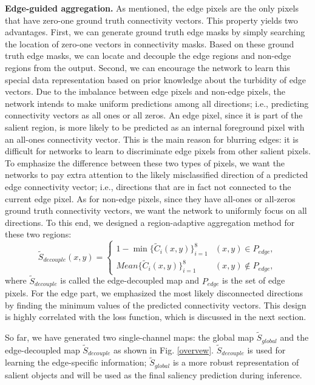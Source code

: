 \documentclass[review]{cvpr}
\begin{document}
\textbf{Edge-guided aggregation.} As mentioned, the edge pixels are the only pixels that have zero-one ground truth connectivity vectors. This property yields two advantages. First, we can generate ground truth edge masks by simply searching the location of zero-one vectors in connectivity masks. Based on these ground truth edge masks, we can locate and decouple the edge regions and non-edge regions from the output. Second, we can encourage the network to learn this special data representation based on prior knowledge about the turbidity of edge vectors. Due to the imbalance between edge pixels and non-edge pixels, the network intends to make uniform predictions among all directions; i.e., predicting connectivity vectors as all ones or all zeros. An edge pixel, since it is part of the salient region, is more likely to be predicted as an internal foreground pixel with an all-ones connectivity vector. This is the main reason for blurring edges: it is difficult for networks to learn to discriminate edge pixels from other salient pixels. To emphasize the difference between these two types of pixels, we want the networks to pay extra attention to the likely misclassified direction of a predicted edge connectivity vector; i.e., directions that are in fact not connected to the current edge pixel. As for non-edge pixels, since they have all-ones or all-zeros ground truth connectivity vectors, we want the network to uniformly focus on all directions. To this end, we designed a region-adaptive aggregation method for these two regions:
\begin{equation}
\label{decouple}
{\widetilde S_{decouple}(x,y)=
\begin{cases}
{1 - \min \{ {{\widetilde C}_i}(x,y)\} _{i = 1}^8}& {(x,y) \in {P_{edge}}},\\
{Mean\{ {{\widetilde C}_i}(x,y)\} _{i = 1}^8}& {(x,y) \notin {P_{edge}}},
\end{cases}}
\end{equation}
where $\widetilde S_{decouple}$ is called the edge-decoupled map and $P_{edge}$ is the set of edge pixels. For the edge part, we emphasized the most likely disconnected directions by finding the minimum values of the predicted connectivity vectors. This design is highly correlated with the loss function, which is discussed in the next section.

So far, we have generated two single-channel maps: the global map $\widetilde S_{global}$ and the edge-decoupled map $\widetilde S_{decouple}$ as shown in Fig. \ref{overvew}. $\widetilde S_{decouple}$ is used for learning the edge-specific information; $\widetilde S_{global}$ is a more robust representation of salient objects and will be used as the final saliency prediction during inference.
\end{document}
